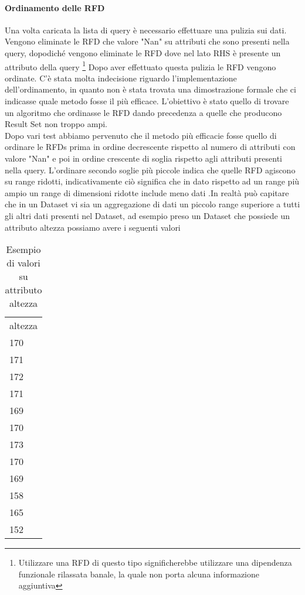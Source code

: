 \paragraph{Ordinamento delle RFD}
Una volta caricata la lista di query è necessario effettuare una pulizia sui dati.
Vengono eliminate le RFD che valore "Nan" su attributi che sono presenti nella query, dopodiché vengono eliminate le RFD dove nel lato RHS è presente un attributo della query \footnote{Utilizzare una RFD di questo tipo significherebbe utilizzare una dipendenza funzionale rilassata banale, la quale non porta alcuna informazione aggiuntiva}
Dopo aver effettuato questa pulizia le RFD vengono ordinate. 
\newline
C'è stata molta indecisione riguardo l'implementazione dell'ordinamento, in quanto non è stata trovata una dimostrazione formale che ci indicasse quale metodo fosse il più efficace.
L'obiettivo è stato quello di trovare un algoritmo che ordinasse le RFD dando precedenza a quelle che producono Result Set non troppo ampi.
\\
Dopo vari test abbiamo pervenuto che il metodo più efficacie fosse quello di ordinare le RFDs prima in ordine decrescente rispetto al numero di attributi con valore "Nan" e poi in ordine crescente di soglia rispetto agli attributi presenti nella query. 
L'ordinare secondo soglie più piccole indica che quelle RFD agiscono su range ridotti, indicativamente ciò significa che in dato rispetto ad un range più ampio un range di dimensioni ridotte include meno dati .In realtà può capitare che in un Dataset vi sia un aggregazione di dati un piccolo range superiore a tutti gli altri dati presenti nel Dataset, ad esempio preso un Dataset che possiede un attributo altezza possiamo avere i seguenti valori
\begin{table}[H]
    \centering
    \begin{tabular}{l }
    altezza \\
    170 \\
    171 \\
    172 \\
    171 \\
    169 \\
    170 \\
    173 \\
    170 \\
    169 \\
    158 \\
    165 \\
    152 \\
    \end{tabular}
    \caption{Esempio di valori su attributo altezza}
    \label{tab:height_list}
\end{table}

